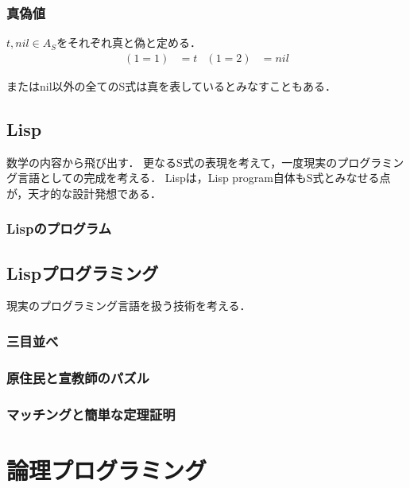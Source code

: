 \documentclass[uplatex, dvipdfmx]{jsreport}
\begin{document}
\subsection{真偽値}

\begin{definition}
    $t,nil\in A_S$をそれぞれ真と偽と定める．
    \begin{align*}
        (1=1) &= t&
        (1=2) &= nil
    \end{align*}
\end{definition}
\begin{remark}
    またはnil以外の全てのS式は真を表しているとみなすこともある．
\end{remark}

\section{Lisp}

数学の内容から飛び出す．
更なるS式の表現を考えて，一度現実のプログラミング言語としての完成を考える．
Lispは，Lisp program自体もS式とみなせる点が，天才的な設計発想である．

\subsection{Lispのプログラム}

\section{Lispプログラミング}

現実のプログラミング言語を扱う技術を考える．

\subsection{三目並べ}

\subsection{原住民と宣教師のパズル}

\subsection{マッチングと簡単な定理証明}

\chapter{論理プログラミング}
\end{document}
